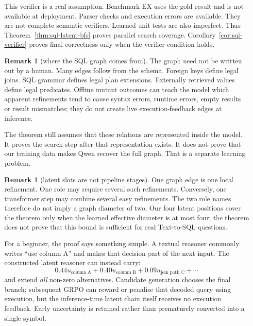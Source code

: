 \documentclass[11pt]{article}
\theoremstyle{definition}
\newtheorem{remark}[theorem]{Remark}
\begin{document}
This verifier is a real assumption. Benchmark EX uses the gold result and is not available at deployment. Parser checks and execution errors are available. They are not complete semantic verifiers. Learned unit tests are also imperfect. Thus Theorem~\ref{thm:sql-latent-bfs} proves parallel search coverage. Corollary~\ref{cor:sql-verifier} proves final correctness only when the verifier condition holds.

\begin{remark}[where the SQL graph comes from]
The graph need not be written out by a human. Many edges follow from the schema. Foreign keys define legal joins. SQL grammar defines legal plan extensions. Externally retrieved values define legal predicates. Offline mutant outcomes can teach the model which apparent refinements tend to cause syntax errors, runtime errors, empty results or result mismatches; they do not create live execution-feedback edges at inference.

The theorem still assumes that these relations are represented inside the model. It proves the search step after that representation exists. It does not prove that our training data makes Qwen recover the full graph. That is a separate learning problem.
\end{remark}

\begin{remark}[latent slots are not pipeline stages]
One graph edge is one local refinement. One role may require several such refinements. Conversely, one transformer step may combine several easy refinements. The two role names therefore do not imply a graph diameter of two. Our four latent positions cover the theorem only when the learned effective diameter is at most four; the theorem does not prove that this bound is sufficient for real Text-to-SQL questions.
\end{remark}

For a beginner, the proof says something simple. A textual reasoner commonly writes ``use column A'' and makes that decision part of the next input. The constructed latent reasoner can instead carry:
\[
0.44u_{\text{column A}}+0.40u_{\text{column B}}
 +0.09u_{\text{join path C}}+\cdots
\]
and extend \emph{all} non-zero alternatives. Candidate generation chooses the final branch; subsequent GRPO can reward or penalise that decoded query using execution, but the inference-time latent chain itself receives no execution feedback. Early uncertainty is retained rather than prematurely converted into a single symbol.
\end{document}
